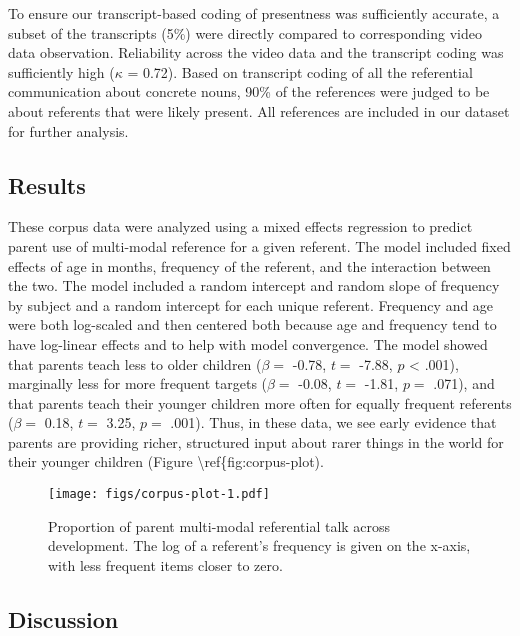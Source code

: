 \documentclass[english,,man,floatsintext]{apa6}
\begin{document}
To ensure our transcript-based coding of presentness was sufficiently accurate, a subset of the transcripts (5\%) were directly compared to corresponding video data observation. Reliability across the video data and the transcript coding was sufficiently high (\(\kappa\) = 0.72). Based on transcript coding of all the referential communication about concrete nouns, 90\% of the references were judged to be about referents that were likely present. All references are included in our dataset for further analysis.

\hypertarget{results}{%
\subsection{Results}\label{results}}

These corpus data were analyzed using a mixed effects regression to predict parent use of multi-modal reference for a given referent. The model included fixed effects of age in months, frequency of the referent, and the interaction between the two. The model included a random intercept and random slope of frequency by subject and a random intercept for each unique referent. Frequency and age were both log-scaled and then centered both because age and frequency tend to have log-linear effects and to help with model convergence. The model showed that parents teach less to older children (\(\beta =\) -0.78, \(t =\) -7.88, \(p\) \textless{} .001), marginally less for more frequent targets (\(\beta =\) -0.08, \(t =\) -1.81, \(p =\) .071), and that parents teach their younger children more often for equally frequent referents (\(\beta =\) 0.18, \(t =\) 3.25, \(p =\) .001). Thus, in these data, we see early evidence that parents are providing richer, structured input about rarer things in the world for their younger children (Figure \textbackslash{}ref\{fig:corpus-plot).

\begin{figure}
\centering
\texttt{[image: figs/corpus-plot-1.pdf]}
\caption{\label{fig:corpus-plot}Proportion of parent multi-modal referential talk across development. The log of a referent's frequency is given on the x-axis, with less frequent items closer to zero.}
\end{figure}

\hypertarget{discussion}{%
\subsection{Discussion}\label{discussion}}
\end{document}
